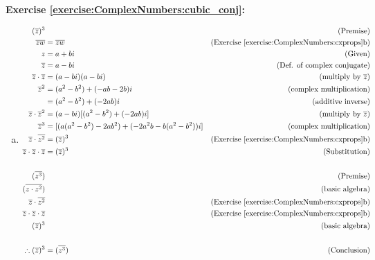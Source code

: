 \noindent\textbf{Exercise \ref{exercise:ComplexNumbers:cubic_conj}:} %
\begin{enumerate}[(a)]
\item
	\begin{align*}
	(\overline{z})^{3} &		&\text{(Premise)}\\
	\overline{z}\overline{w} &= \overline{zw}	&\text{(Exercise 									\ref{exercise:ComplexNumbers:cxprops}b)}\\
	z &= a + bi 		&\text{(Given)}\\
	\overline{z} &= a - bi		&\text{(Def. of complex conjugate)}\\
	\overline{z} \cdot \overline{z} &= (a - bi)(a - bi)		&\text{(multiply by}\ 		\overline{z})\\
	\overline{z}^{2} &= (a^{2} - b^{2}) + (-ab -2b)i		&\text{(complex 				multiplication)}\\
	 &= (a^{2} - b^{2}) + (-2ab)i		&\text{(additive inverse)}\\
	 \overline{z} \cdot \overline{z}^{2} &= (a - bi)[(a^{2} - b^{2}) + 					(-2ab)i]		&\text{(multiply by}\ \overline{z})\\
	 \overline{z}^{3} &= [(a(a^{2} - b^{2}) - 2ab^{2}) + (-2a^{2}b -b(a^{2} - b^{2}))i]		&\text{(complex multiplication)}\\
	 \overline{z} \cdot \overline{z^{2}} &= (\overline{z})^{3} &\text{(Exercise 									\ref{exercise:ComplexNumbers:cxprops}b)}\\
	 \overline{z} \cdot \overline{z} \cdot \overline{z} &= (\overline{z})^{3} &\text{(Substitution)}\\
	 \\
	 (\overline{z^{3}})& &\text{(Premise)}\\
	 (\overline{z \cdot z^{2}})&   &\text{(basic algebra)}\\
	 \overline{z} \cdot \overline{z^{2}}&   &\text{(Exercise 									\ref{exercise:ComplexNumbers:cxprops}b)}\\
	 \overline{z} \cdot \overline{z} \cdot \overline{z}&    &\text{(Exercise 									\ref{exercise:ComplexNumbers:cxprops}b)}\\
	 (\overline{z})^{3}&   &\text{(basic algebra)}\\
	 \\
	 \therefore (\overline{z})^{3} &= (\overline{z^{3}}) &\text{(Conclusion)}
	\end{align*}
	

\end{enumerate}
